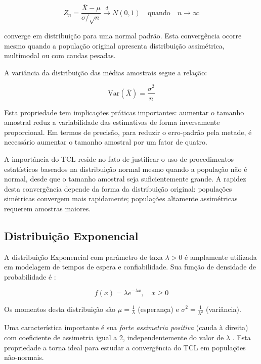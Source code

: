 \documentclass[12pt,a4paper]{article}
\begin{document}
\begin{equation}
Z_n = \frac{\overline{X} - \mu}{\sigma/\sqrt{n}} \xrightarrow{d} N(0, 1) \quad \text{quando} \quad n \to \infty
\end{equation}

converge em distribuição para uma normal padrão. Esta convergência ocorre mesmo quando a população original apresenta distribuição assimétrica, multimodal ou com caudas pesadas.

A variância da distribuição das médias amostrais segue a relação:

\begin{equation}
\text{Var}(\overline{X}) = \frac{\sigma^2}{n}
\end{equation}

Esta propriedade tem implicações práticas importantes: aumentar o tamanho amostral reduz a variabilidade das estimativas de forma inversamente proporcional. Em termos de precisão, para reduzir o erro-padrão pela metade, é necessário aumentar o tamanho amostral por um fator de quatro.

A importância do TCL reside no fato de justificar o uso de procedimentos estatísticos baseados na distribuição normal mesmo quando a população não é normal, desde que o tamanho amostral seja suficientemente grande. A rapidez desta convergência depende da forma da distribuição original: populações simétricas convergem mais rapidamente; populações altamente assimétricas requerem amostras maiores.

\subsection{Distribuição Exponencial}

A distribuição Exponencial com parâmetro de taxa $\lambda > 0$ é amplamente utilizada em modelagem de tempos de espera e confiabilidade. Sua função de densidade de probabilidade é \cite{devore2015}:

\begin{equation}
f(x) = \lambda e^{-\lambda x}, \quad x \geq 0
\end{equation}

Os momentos desta distribuição são $\mu = \frac{1}{\lambda}$ (esperança) e $\sigma^2 = \frac{1}{\lambda^2}$ (variância). 

Uma característica importante é sua \emph{forte assimetria positiva} (cauda à direita) com coeficiente de assimetria igual a 2, independentemente do valor de $\lambda$ \cite{montgomery2016}. Esta propriedade a torna ideal para estudar a convergência do TCL em populações não-normais.
\end{document}
